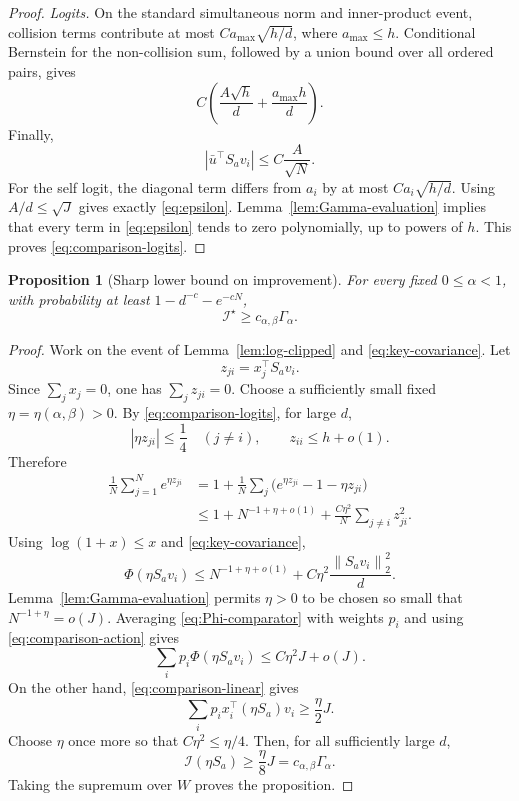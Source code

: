 \documentclass[11pt]{article}
\newtheorem{proposition}[theorem]{Proposition}
\theoremstyle{remark}
\newcommand{\norm}[1]{\left\lVert #1\right\rVert}
\newcommand{\cI}{\mathcal I}
\begin{document}
\begin{proof}
\emph{Logits.}
On the standard simultaneous norm and inner-product event, collision
terms contribute at most \(Ca_{\max}\sqrt{h/d}\), where
\(a_{\max}\leq h\).  Conditional Bernstein for the non-collision sum,
followed by a union bound over all ordered pairs, gives
\[
 C\left(\frac{A\sqrt h}{d}+\frac{a_{\max}h}{d}\right).
\]
Finally,
\[
 |\bar u^\top S_av_i|
 \leq C\frac{A}{\sqrt N}.
\]
For the self logit, the diagonal term differs from \(a_i\) by at most
\(Ca_i\sqrt{h/d}\).  Using \(A/d\leq\sqrt J\) gives exactly
\eqref{eq:epsilon}.  Lemma~\ref{lem:Gamma-evaluation} implies that
every term in \eqref{eq:epsilon} tends to zero polynomially, up to
powers of \(h\).  This proves \eqref{eq:comparison-logits}.
\end{proof}

\begin{proposition}[Sharp lower bound on improvement]
\label{prop:sub-lower}
For every fixed \(0\leq\alpha<1\), with probability at least
\(1-d^{-c}-e^{-cN}\),
\[
 \cI^\star\geq c_{\alpha,\beta}\Gamma_\alpha.
\]
\end{proposition}

\begin{proof}
Work on the event of Lemma~\ref{lem:log-clipped} and
\eqref{eq:key-covariance}.  Let
\[
 z_{ji}=x_j^\top S_av_i.
\]
Since \(\sum_jx_j=0\), one has \(\sum_jz_{ji}=0\).
Choose a sufficiently small fixed
\(\eta=\eta(\alpha,\beta)>0\).  By
\eqref{eq:comparison-logits}, for large \(d\),
\[
 |\eta z_{ji}|\leq\frac14\quad(j\neq i),
 \qquad
 z_{ii}\leq h+o(1).
\]
Therefore
\begin{align}
 \frac1N\sum_{j=1}^Ne^{\eta z_{ji}}
 &=
 1+\frac1N\sum_j
 \bigl(e^{\eta z_{ji}}-1-\eta z_{ji}\bigr)\\
 &\leq
 1+N^{-1+\eta+o(1)}
 +\frac{C\eta^2}{N}\sum_{j\neq i}z_{ji}^2.
\end{align}
Using \(\log(1+x)\leq x\) and
\eqref{eq:key-covariance},
\begin{equation}
 \Phi(\eta S_av_i)
 \leq
 N^{-1+\eta+o(1)}
 +C\eta^2\frac{\norm{S_av_i}_2^2}{d}.
 \label{eq:Phi-comparator}
\end{equation}
Lemma~\ref{lem:Gamma-evaluation} permits \(\eta>0\) to be chosen so
small that \(N^{-1+\eta}=o(J)\).  Averaging
\eqref{eq:Phi-comparator} with weights \(p_i\) and using
\eqref{eq:comparison-action} gives
\[
 \sum_i p_i\Phi(\eta S_av_i)
 \leq C\eta^2J+o(J).
\]
On the other hand, \eqref{eq:comparison-linear} gives
\[
 \sum_i p_i x_i^\top(\eta S_a)v_i
 \geq\frac{\eta}{2}J.
\]
Choose \(\eta\) once more so that \(C\eta^2\leq\eta/4\).
Then, for all sufficiently large \(d\),
\[
 \cI(\eta S_a)\geq\frac{\eta}{8}J
 =c_{\alpha,\beta}\Gamma_\alpha.
\]
Taking the supremum over \(W\) proves the proposition.
\end{proof}
\end{document}
